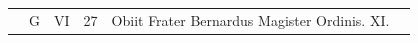 \documentclass[11pt,openany]{book}
\renewcommand{\\}{\par\hspace*{1em}} %
\begin{document}
\begin{center}
\begin{tabular}{l | l | l | r | l l}
\color{Red}  & G & \color{Red} VI & 27 & Obiit Frater Bernardus Magister Ordinis. XI. & \color{Red} \\



\end{tabular}
\end{center}
\end{document}
